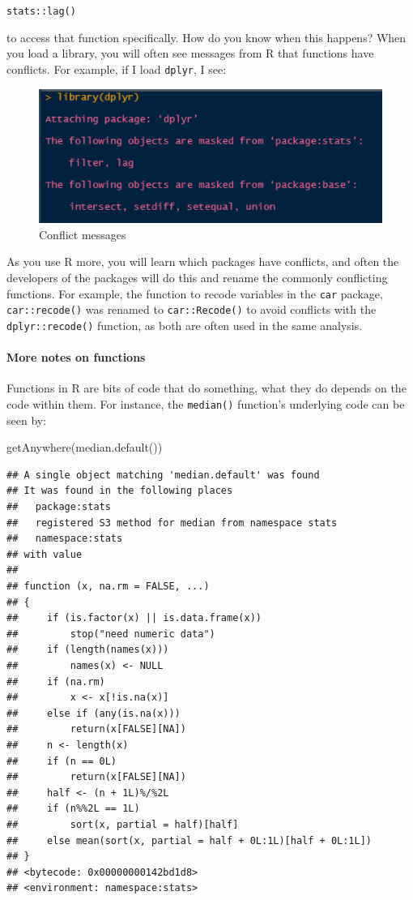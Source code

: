 \documentclass[
]{article}
\newenvironment{Shaded}{\begin{snugshade}}{\end{snugshade}}
\newcommand{\FunctionTok}[1]{\textcolor[rgb]{0.00,0.00,0.00}{#1}}
\newcommand{\NormalTok}[1]{#1}
\begin{document}
\texttt{stats::lag()}

to access that function specifically. How do you know when this happens?
When you load a library, you will often see messages from R that
functions have conflicts. For example, if I load \texttt{dplyr}, I see:

\begin{figure}
\centering
\includegraphics{images/dplyrconflict.png}
\caption{Conflict messages}
\end{figure}

As you use R more, you will learn which packages have conflicts, and
often the developers of the packages will do this and rename the
commonly conflicting functions. For example, the function to recode
variables in the \texttt{car} package, \texttt{car::recode()} was renamed to
\texttt{car::Recode()} to avoid conflicts with the \texttt{dplyr::recode()} function,
as both are often used in the same analysis.

\hypertarget{more-notes-on-functions}{%
\paragraph{More notes on functions}\label{more-notes-on-functions}}

Functions in R are bits of code that do something, what they do depends
on the code within them. For instance, the \texttt{median()} function's
underlying code can be seen by:

\begin{Shaded}
\begin{Highlighting}[]
\FunctionTok{getAnywhere}\NormalTok{(}\FunctionTok{median.default}\NormalTok{())}
\end{Highlighting}
\end{Shaded}

\begin{verbatim}
## A single object matching 'median.default' was found
## It was found in the following places
##   package:stats
##   registered S3 method for median from namespace stats
##   namespace:stats
## with value
## 
## function (x, na.rm = FALSE, ...) 
## {
##     if (is.factor(x) || is.data.frame(x)) 
##         stop("need numeric data")
##     if (length(names(x))) 
##         names(x) <- NULL
##     if (na.rm) 
##         x <- x[!is.na(x)]
##     else if (any(is.na(x))) 
##         return(x[FALSE][NA])
##     n <- length(x)
##     if (n == 0L) 
##         return(x[FALSE][NA])
##     half <- (n + 1L)%/%2L
##     if (n%%2L == 1L) 
##         sort(x, partial = half)[half]
##     else mean(sort(x, partial = half + 0L:1L)[half + 0L:1L])
## }
## <bytecode: 0x00000000142bd1d8>
## <environment: namespace:stats>
\end{verbatim}
\end{document}
